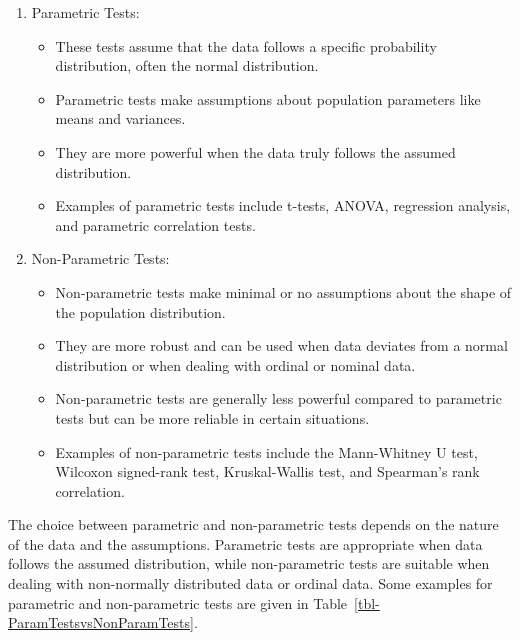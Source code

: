 \documentclass[
  a4paper,
]{scrbook}
\providecommand{\tightlist}{%
  \setlength{\itemsep}{0pt}\setlength{\parskip}{0pt}}\usepackage{longtable,booktabs,array}
\begin{document}
\begin{enumerate}
\def\labelenumi{\arabic{enumi}.}
\tightlist
\item
  Parametric Tests:

  \begin{itemize}
  \tightlist
  \item
    These tests assume that the data follows a specific probability
    distribution, often the normal distribution.
  \item
    Parametric tests make assumptions about population parameters like
    means and variances.
  \item
    They are more powerful when the data truly follows the assumed
    distribution.
  \item
    Examples of parametric tests include t-tests, ANOVA, regression
    analysis, and parametric correlation tests.
  \end{itemize}
\item
  Non-Parametric Tests:

  \begin{itemize}
  \tightlist
  \item
    Non-parametric tests make minimal or no assumptions about the shape
    of the population distribution.
  \item
    They are more robust and can be used when data deviates from a
    normal distribution or when dealing with ordinal or nominal data.
  \item
    Non-parametric tests are generally less powerful compared to
    parametric tests but can be more reliable in certain situations.
  \item
    Examples of non-parametric tests include the Mann-Whitney U test,
    Wilcoxon signed-rank test, Kruskal-Wallis test, and Spearman's rank
    correlation.
  \end{itemize}
\end{enumerate}

The choice between parametric and non-parametric tests depends on the
nature of the data and the assumptions. Parametric tests are appropriate
when data follows the assumed distribution, while non-parametric tests
are suitable when dealing with non-normally distributed data or ordinal
data. Some examples for parametric and non-parametric tests are given in
Table~\ref{tbl-ParamTestsvsNonParamTests}.
\end{document}
